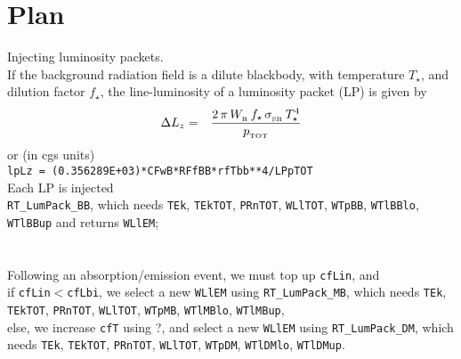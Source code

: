 \documentclass[usenatbib]{mn2e}
\newcommand{\subB}{_{_{\rm B}}}
\numberwithin{equation}{section}
\begin{document}
\newpage

\section{Plan}

\vspace{0.4cm}

{\sc Injecting luminosity packets.} \\

If the background radiation field is a dilute blackbody, with temperature $T_\star$, and dilution factor $f_\star$, the line-luminosity of a luminosity packet (LP) is given by
\begin{eqnarray}
\Delta L_z&=&\frac{2\,\pi\, W\subB\, f_\star\, \sigma_{_{\rm SB}}\,T_\star^4}{p_{_{\rm TOT}}}
\end{eqnarray}
or (in cgs units) \\

\noindent\verb|lpLz = (0.356289E+03)*CFwB*RFfBB*rfTbb**4/LPpTOT|\\

Each LP is injected \\

\noindent\verb|RT_LumPack_BB|, which needs \verb|TEk|, \verb|TEkTOT|, \verb|PRnTOT|, \verb|WLlTOT|, \verb|WTpBB|, \verb|WTlBBlo|, \verb|WTlBBup| and returns \verb|WLlEM|; \\\\


 \\

Following an absorption/emission event, we must top up \verb|cfLin|, and \\

\noindent if \verb|cfLin|$<$\verb|cfLbi|, we select a new \verb|WLlEM| using \verb|RT_LumPack_MB|, which needs \verb|TEk|, \verb|TEkTOT|, \verb|PRnTOT|, \verb|WLlTOT|, \verb|WTpMB|, \verb|WTlMBlo|, \verb|WTlMBup|, \\

\noindent else, we increase \verb|cfT| using ?, and select a new \verb|WLlEM| using \verb|RT_LumPack_DM|, which needs \verb|TEk|, \verb|TEkTOT|, \verb|PRnTOT|, \verb|WLlTOT|, \verb|WTpDM|, \verb|WTlDMlo|, \verb|WTlDMup|. \\
\end{document}
